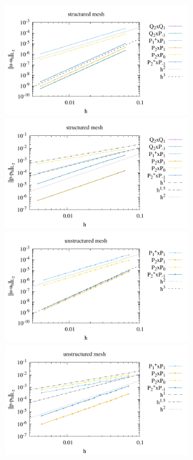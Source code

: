 \begin{center}
\includegraphics[width=8cm]{python_codes/fieldstone_120/paperresults/bocg12_structured_errorsV.pdf}
\includegraphics[width=8cm]{python_codes/fieldstone_120/paperresults/bocg12_structured_errorsP.pdf}\\
\includegraphics[width=8cm]{python_codes/fieldstone_120/paperresults/bocg12_unstructured_errorsV.pdf}
\includegraphics[width=8cm]{python_codes/fieldstone_120/paperresults/bocg12_unstructured_errorsP.pdf}
\end{center}


